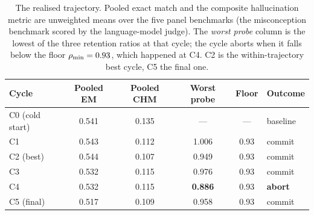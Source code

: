 \begin{table}[htbp]
\centering
\small
\begin{tabular}{@{}lccccl@{}}
\toprule
\textbf{Cycle} & \textbf{Pooled EM} & \textbf{Pooled CHM} & \textbf{Worst probe} & \textbf{Floor} & \textbf{Outcome} \\
\midrule
C0 (cold start) & 0.541 & 0.135 & ---   & ---  & baseline \\
C1              & 0.543 & 0.112 & 1.006 & 0.93 & commit \\
C2 (best)       & 0.544 & 0.107 & 0.949 & 0.93 & commit \\
C3              & 0.532 & 0.115 & 0.976 & 0.93 & commit \\
C4              & 0.532 & 0.115 & \textbf{0.886} & 0.93 & \textbf{abort} \\
C5 (final)      & 0.517 & 0.109 & 0.958 & 0.93 & commit \\
\bottomrule
\end{tabular}
\caption[The six-cycle trajectory at a glance]{The realised trajectory. Pooled exact
match and the composite hallucination metric are unweighted means over the five panel
benchmarks (the misconception benchmark scored by the language-model judge). The
\emph{worst probe} column is the lowest of the three retention ratios at that cycle;
the cycle aborts when it falls below the floor $\rho_{\min} = 0.93$, which happened at C4.
C2 is the within-trajectory best cycle, C5 the final one.}
\label{tab:traj-glance}
\end{table}

